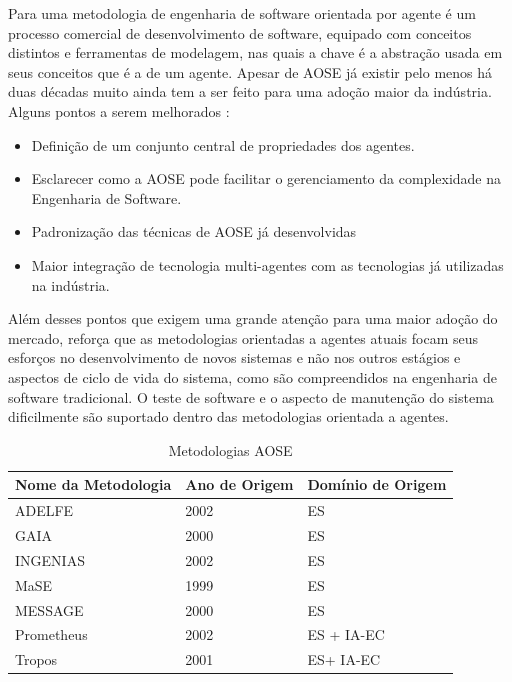 Para \citet{akbari2010survey} uma metodologia de engenharia de software orientada por agente é um processo comercial de desenvolvimento de software, equipado com conceitos distintos e ferramentas de modelagem, nas quais a chave é a abstração usada em seus conceitos que é a de um agente. Apesar de AOSE já existir pelo menos há duas décadas muito ainda tem a ser feito para uma adoção maior da indústria. Alguns pontos a serem melhorados \cite{sturm2014agent}:

\begin{itemize}
\item Definição de um conjunto central de propriedades dos agentes.
\item Esclarecer como a AOSE pode facilitar o gerenciamento da complexidade na Engenharia de Software.
\item Padronização das técnicas de AOSE já desenvolvidas
\item Maior integração de tecnologia multi-agentes com as tecnologias já utilizadas na indústria.
\end{itemize}

Além desses pontos que exigem uma grande atenção para uma maior adoção do mercado, \citet{sturm2014landscape} reforça que as metodologias orientadas a agentes atuais focam seus esforços no desenvolvimento de novos sistemas e não nos outros estágios e aspectos de ciclo de vida do sistema, como são compreendidos na engenharia de software tradicional. O teste de software e o aspecto de manutenção do sistema dificilmente são suportado dentro das metodologias orientada a agentes.

\begin{table}[h]
\centering
\caption{Metodologias AOSE}
\label{tab:metodologias}
\begin{tabular}{@{}lll@{}}
\toprule
Nome da Metodologia & Ano de Origem & Domínio de Origem \\ \midrule
ADELFE              & 2002          & ES                \\ 
GAIA                & 2000          & ES                \\ 
INGENIAS            & 2002          & ES                \\ 
MaSE                & 1999          & ES                \\ 
MESSAGE             & 2000          & ES                \\ 
Prometheus          & 2002          & ES + IA-EC        \\ 
Tropos              & 2001          & ES+ IA-EC         \\ \bottomrule
\end{tabular}
\end{table}

